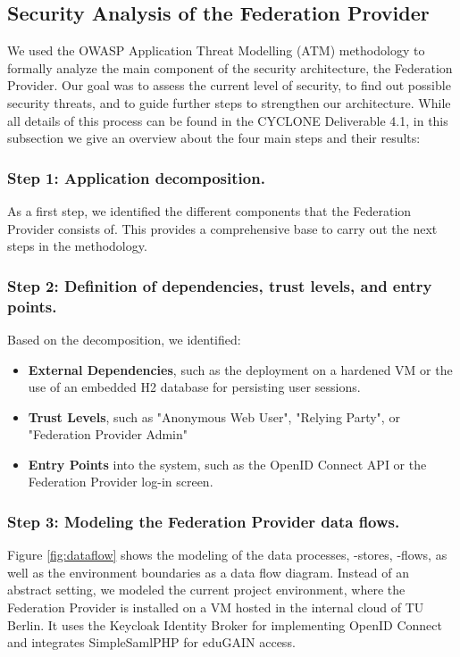 \documentclass{llncs}
\begin{document}
\subsection{Security Analysis of the Federation Provider}

We used the OWASP Application Threat Modelling (ATM) methodology to formally analyze the main component of the security architecture, the Federation Provider. Our goal was to assess the current level of security, to find out possible security threats, and to guide further steps to strengthen our architecture. While all details of this process can be found in the CYCLONE Deliverable 4.1, in this subsection we give an overview about the four main steps and their results:

\subsubsection{Step 1: Application decomposition.}

As a first step, we identified the different components that the Federation Provider consists of. This provides a comprehensive base to carry out the next steps in the methodology.

\subsubsection{Step 2: Definition of dependencies, trust levels, and entry points.}

Based on the decomposition, we identified:

\begin{itemize}
	\item \textbf{External Dependencies}, such as the deployment on a hardened VM or the use of an embedded H2 database for persisting user sessions.
	\item \textbf{Trust Levels}, such as "Anonymous Web User", "Relying Party", or "Federation Provider Admin"
	\item \textbf{Entry Points} into the system, such as the OpenID Connect API or the Federation Provider log-in screen.
\end{itemize}
	
\subsubsection{Step 3: Modeling the Federation Provider data flows.}

Figure \ref{fig:dataflow} shows the modeling of the data processes, -stores, -flows, as well as the environment boundaries as a data flow diagram. Instead of an abstract setting, we modeled the current project environment, where the Federation Provider is installed on a VM hosted in the internal cloud of TU Berlin. It uses the Keycloak Identity Broker for implementing OpenID Connect and integrates SimpleSamlPHP for eduGAIN access.
	
\end{document}
